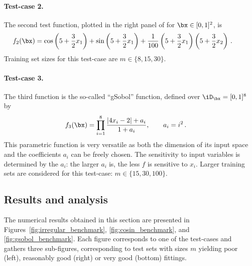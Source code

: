 \paragraph{Test-case 2.}

The second test function, plotted in the right panel of  for $\bx\in[0,1]^2$, is 
\begin{align*}
   f_2(\bx) 
   &= \cos \left(5 + \frac{3}{2}x_1 \right) + \sin \left(5 + \frac{3}{2}x_1 \right) 
   + \frac{1}{100} \left(5 + \frac{3}{2}x_1 \right) \left(5 + \frac{3}{2}x_2 \right)\,.
\end{align*}
Training set sizes for this test-case are $m\in\{8, 15, 30\}$.

\paragraph{Test-case 3.}

The third function is the so-called ``gSobol'' function, defined over $\iD_\bx=[0,1]^8$ by
\begin{equation*}
  f_3(\bx) = \prod_{i=1}^{8} \frac{|4x_i - 2| + a_i}{1 + a_i}, \qquad a_i = i^2 \,.
\end{equation*}
This parametric function is very versatile as both the dimension of its input space and the coefficients $a_i$ can be freely chosen. 
The sensitivity to input variables is determined by the $a_i$: the larger $a_i$ is, the less $f$ is sensitive to $x_i$. 
Larger training sets are considered for this test-case: $m\in\{15, 30, 100\}$.

\subsection{Results and analysis}

The numerical results obtained in this section are presented in Figures~\ref{fig:irregular_benchmark}, \ref{fig:cosin_benchmark}, and \ref{fig:gsobol_benchmark}. 
Each figure corresponds to one of the test-cases and gathers three sub-figures, corresponding to test sets with sizes $m$ yielding poor (left), reasonably good (right) or very good (bottom) fittings. 
 
